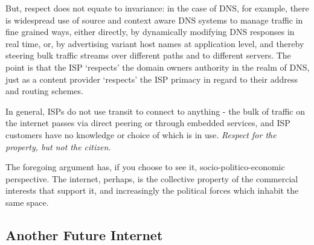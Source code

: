 But, respect does not equate to invariance: in the case of DNS, for example, there is widespread use of source and context aware DNS systems to manage traffic in fine grained ways, either directly, by dynamically modifying DNS responses in real time, or, by advertising variant host names at application level, and thereby steering bulk traffic streams over different paths and to different servers.  The point is that the ISP `respects' the domain owners authority in the realm of DNS, just as a content provider `respects' the ISP primacy in regard to their address and routing schemes. 

 
 In general, ISPs do not use transit to connect to anything - the bulk of traffic on the internet passes via direct peering or through embedded services, and ISP customers have no knowledge or choice of which is in use. \textit{ Respect for the property, but not the citizen.}
 
The foregoing argument has, if you choose to see it, socio-politico-economic perspective.   The internet, perhaps, is the collective property of the commercial interests that support it, and increasingly the political forces which inhabit the same space.




\subsection{Another Future Internet}
